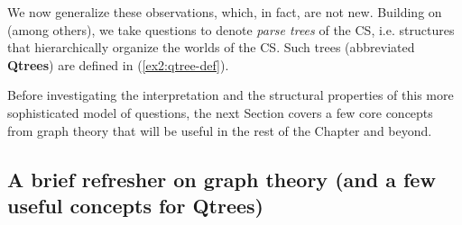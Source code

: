 We now generalize these observations, which, in fact, are not new. Building on \citet{Buring2003,Riester2019,Onea2016,Ippolito2019,Zhang2022} (among others), we take questions to denote \textit{parse trees} of the CS, i.e. structures that hierarchically organize the worlds of the CS. Such trees (abbreviated \textbf{Qtrees}) are defined in (\ref{ex2:qtree-def}). 
\begin{exe}
	\label{ex2:qtree-def}
\end{exe}

Before investigating the interpretation and the structural properties of this more sophisticated model of questions, the next Section covers a few core concepts from graph theory that will be useful in the rest of the Chapter and beyond.


\subsection{A brief refresher on graph theory (and a few useful concepts for Qtrees)}

